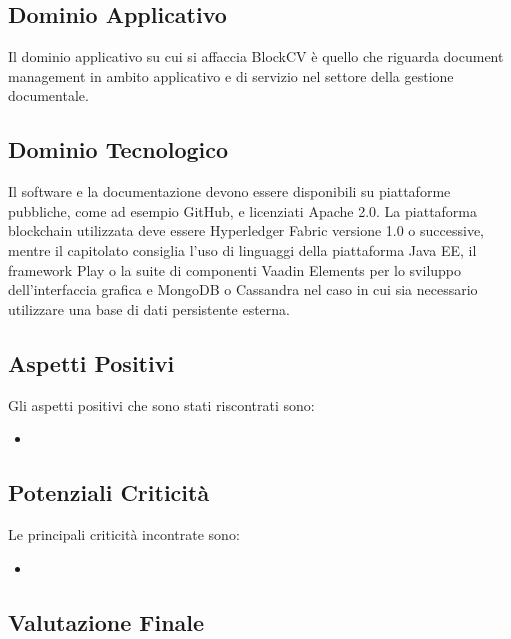 \subsection{Dominio Applicativo}
	Il dominio applicativo su cui si affaccia BlockCV è quello che riguarda document management in ambito applicativo e di servizio nel settore della gestione
	documentale.

\subsection{Dominio Tecnologico}
	Il software e la documentazione devono essere disponibili su piattaforme pubbliche, come ad esempio GitHub, e licenziati Apache 2.0. La piattaforma blockchain utilizzata deve essere Hyperledger Fabric versione 1.0 o successive, mentre il capitolato consiglia l'uso di linguaggi della piattaforma Java EE, il framework Play o la suite di componenti Vaadin Elements per lo sviluppo dell'interfaccia grafica e MongoDB o Cassandra nel caso in cui sia necessario utilizzare una base di dati persistente esterna.
	
\subsection{Aspetti Positivi}
	Gli aspetti positivi che sono stati riscontrati sono:
	\begin{itemize}
		\item 
	\end{itemize}

\subsection{Potenziali Criticità}
	Le principali criticità incontrate sono:
	\begin{itemize}
		\item 
	\end{itemize}

\subsection{Valutazione Finale}